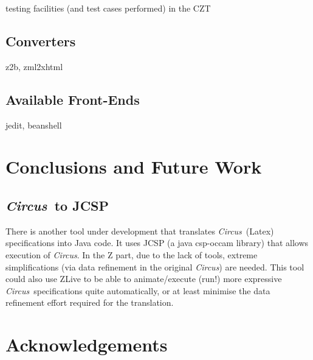 \documentclass{llncs}
\newcommand{\Circus}{{\sf\slshape Circus}}
\begin{document}
testing facilities (and test cases performed) in the CZT

\subsection{Converters}

z2b, zml2xhtml

\subsection{Available Front-Ends}

jedit, beanshell

\section{Conclusions and Future Work} \label{sec:conclusions}

\subsection{\Circus\ to JCSP}

        There is another tool under development that translates \Circus\ (Latex) specifications into Java code.
        It uses JCSP (a java csp-occam library) that allows execution of \Circus.
        In the Z part, due to the lack of tools, extreme simplifications (via data refinement in the original \Circus)
        are needed.
        This tool could also use ZLive to be able to animate/execute (run!) more expressive \Circus\ specifications quite
        automatically, or at least minimise the data refinement effort required for the translation.


\section*{Acknowledgements}



\end{document}
